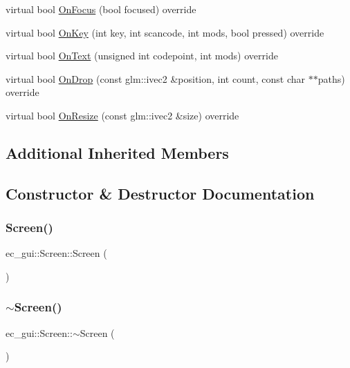 \begin{DoxyCompactItemize}
virtual bool \mbox{\hyperlink{classec__gui_1_1_screen_a3a0f971501303d0285c0f38c2b424237}{On\+Focus}} (bool focused) override
\item 
virtual bool \mbox{\hyperlink{classec__gui_1_1_screen_a17f251d79b8e3d07658c37768f1572d3}{On\+Key}} (int key, int scancode, int mods, bool pressed) override
\item 
virtual bool \mbox{\hyperlink{classec__gui_1_1_screen_ac2f9e1f91cc01bbe22d3b8c9c19659b6}{On\+Text}} (unsigned int codepoint, int mods) override
\item 
virtual bool \mbox{\hyperlink{classec__gui_1_1_screen_adb7eb3a5c83749054a6b275cd05ddee7}{On\+Drop}} (const glm\+::ivec2 \&position, int count, const char $\ast$$\ast$paths) override
\item 
virtual bool \mbox{\hyperlink{classec__gui_1_1_screen_a739fe1176382a7f6f399610da74972ea}{On\+Resize}} (const glm\+::ivec2 \&size) override
\end{DoxyCompactItemize}
\subsection*{Additional Inherited Members}


\subsection{Constructor \& Destructor Documentation}
\mbox{\label{classec__gui_1_1_screen_a70d376c7107983dc3e57f70c2eef3ffa}} 
\subsubsection{\texorpdfstring{Screen()}{Screen()}}
{\footnotesize\ttfamily ec\+\_\+gui\+::\+Screen\+::\+Screen (\begin{DoxyParamCaption}{ }\end{DoxyParamCaption})\hspace{0.3cm}{\ttfamily [explicit]}}

\mbox{\label{classec__gui_1_1_screen_ae31ba095c31a7811bb18b0049511565c}} 
\subsubsection{\texorpdfstring{$\sim$\+Screen()}{~Screen()}}
{\footnotesize\ttfamily ec\+\_\+gui\+::\+Screen\+::$\sim$\+Screen (\begin{DoxyParamCaption}{ }\end{DoxyParamCaption})}



